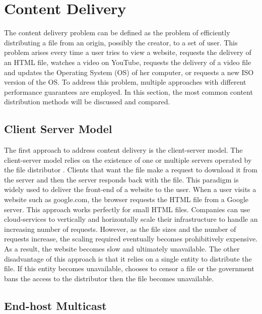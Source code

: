 
\chapter{Content Delivery} \label{chap:cn}{

The content delivery problem can be defined as the problem of efficiently distributing a file from an origin, possibly the creator, to a set of user. This problem arises every time a user tries to view a website, requests the delivery of an HTML file, watches a video on YouTube, requests the delivery of a video file and updates the Operating System (OS) of her computer, or requests a new ISO version of the OS. To address this problem, multiple approaches with different performance guarantees are employed. In this section, the most common content distribution methods will be discussed and compared.

\section{Client Server Model}{

The first approach to address content delivery is the client-server model. The client-server model relies on the existence of one or multiple servers operated by the file distributor \cite{Berson:245910}. Clients that want the file make a request to download it from the server and then the server responds back with the file. This paradigm is widely used to deliver the front-end of a website to the user. When a user visits a website such as google.com, the browser requests the HTML file from a Google server. This approach works perfectly for small HTML files. Companies can use cloud-services to vertically and horizontally scale their infrastructure to handle an increasing number of requests. However, as the file sizes and the number of requests increase, the scaling required eventually becomes prohibitively expensive. As a result, the website becomes slow and ultimately unavailable. The other disadvantage of this approach is that it relies on a single entity to distribute the file. If this entity becomes unavailable, chooses to censor a file or the government bans the access to the distributor then the file becomes unavailable.
}
\section{End-host Multicast}{

}}
